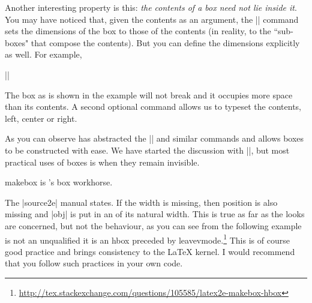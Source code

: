 {Another interesting property is this: \emph{the contents of a box need not lie inside it}. You may have
noticed that, given the contents as an argument, the
|\framebox| command sets the dimensions of the box
to those of the contents (in reality, to the ``sub-boxes"
that compose the contents). But you can define the
dimensions explicitly as well. For example,

\begin{scriptexample}[]{}
||


\end{scriptexample}

The box as is shown in the example will not break and it occupies more space than its contents. A second optional command allows us to typeset the contents, left, center or right.

\begin{codeexample}[vbox]

\par

\par

\par

\par

\par

\par
\end{codeexample}

As you can observe \latexe has abstracted the |\hfill| and similar commands and allows boxes to be constructed with ease. We have started the discussion with |\framebox|, but most practical uses of boxes is when they remain invisible.

\begin{docCommand}{makebox} {  } 
 is \latex's box workhorse.
 \end{docCommand}

The |source2e| manual states. If the width is missing, then position is also missing and |obj|  is put in an  of its natural width. This is true as far as the looks are concerned, but not the behaviour, as you can see
from the following example is not an unqualified \cmd{\hbox} it is an hbox preceded by leavevmode.\footnote{\url{http://tex.stackexchange.com/questions/105585/latex2e-makebox-hbox}} This is of course good practice and brings consistency to the LaTeX kernel. I would recommend that you follow such practices in your own code. 

}
